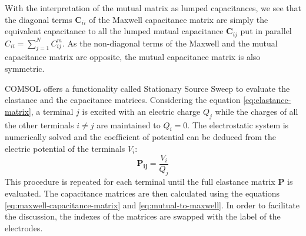 With the interpretation of the mutual matrix as lumped capacitances, we see that the diagonal terms $\bm{C}_{ii}$ of the Maxwell capacitance matrix are simply the equivalent capacitance to all the lumped mutual capacitance $\bm{C}_{ij}$ put in parallel $C_{ii} = \sum_{j=1}^N C_{ij}^m$. As the non-diagonal terms of the Maxwell and the mutual capacitance matrix are opposite, the mutual capacitance matrix is also symmetric.

COMSOL offers a functionality called Stationary Source Sweep to evaluate the elastance and the capacitance matrices. Considering the equation \ref{eq:elastance-matrix}, a terminal $j$ is excited with an electric charge $Q_j$ while the charges of all the other terminals $i\neq j$ are maintained to $Q_i=0$. The electrostatic system is numerically solved and the coefficient of potential can be deduced from the electric potential of the terminals $V_i$:
\begin{equation}
\bm{P_{ij}} = \frac{V_i}{Q_j}
\end{equation}
This procedure is repeated for each terminal until the full elastance matrix $\bm{P}$ is evaluated. The capacitance matrices are then calculated using the equations \ref{eq:maxwell-capacitance-matrix} and \ref{eq:mutual-to-maxwell}. In order to facilitate the discussion, the indexes of the matrices are swapped with the label of the electrodes. 

